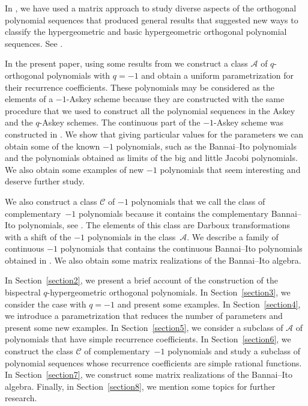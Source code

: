 \documentclass[10pt,a4paper]{amsart}
\def\cA{\mathcal A}
\def\cC{\mathcal C}
\numberwithin{equation}{section}
\begin{document}
In \cite{Mops, Rec, PSGH,Uni}, we have used a matrix approach to study diverse aspects of the orthogonal polynomial sequences that produced general results that suggested new ways to classify the hypergeometric and basic hypergeometric orthogonal polynomial sequences. See \cite{KAsk, K2, K3}.

In the present paper, using some results from \cite{Uni} we construct a class $\cA$ of $q$-orthogonal polynomials with $q=-1$ and obtain a uniform parametrization for their recurrence coefficients. These polynomials may be considered as the elements of a $-1$-Askey scheme because they are constructed with the same procedure that we used to construct all the polynomial sequences in the Askey and the $q$-Askey schemes. The continuous part of the $-1$-Askey scheme was constructed in \cite{PellVZ}. We show that giving particular values for the parameters we can obtain some of the known $-1$ polynomials, such as the Bannai--Ito polynomials and the polynomials obtained as limits of the big and little Jacobi polynomials. We also obtain some examples of new $-1$ polynomials that seem interesting and deserve further study.

We also construct a class $\cC$ of $-1$ polynomials that we call the class of complementary~$-1$ polynomials because it contains the complementary Bannai--Ito polynomials, see \cite{GenVZ2,TsujiDunkl}. The elements of this class are Darboux transformations with a shift of the $-1$ polynomials in the class~$\cA$.
We describe a family of continuous $-1$ polynomials that contains the continuous Bannai--Ito polynomials obtained in \cite{PellVZ}. We also obtain some matrix realizations of the Bannai--Ito algebra.

In Section~\ref{section2}, we present a brief account of the construction of the bispectral $q$-hypergeometric orthogonal polynomials. In Section~\ref{section3}, we consider the case with $q=-1$ and present some examples. In Section~\ref{section4}, we introduce a parametrization that reduces the number of parameters and present some new examples. In Section~\ref{section5}, we consider a subclass of $\cA$ of polynomials that have simple recurrence coefficients. In Section~\ref{section6}, we construct the class $\cC$ of complementary~$-1$ polynomials and study a subclass of polynomial sequences whose recurrence coefficients are simple rational functions. In Section~\ref{section7}, we construct some matrix realizations of the Bannai--Ito algebra.
Finally, in Section~\ref{section8}, we mention some topics for further research.
\end{document}
